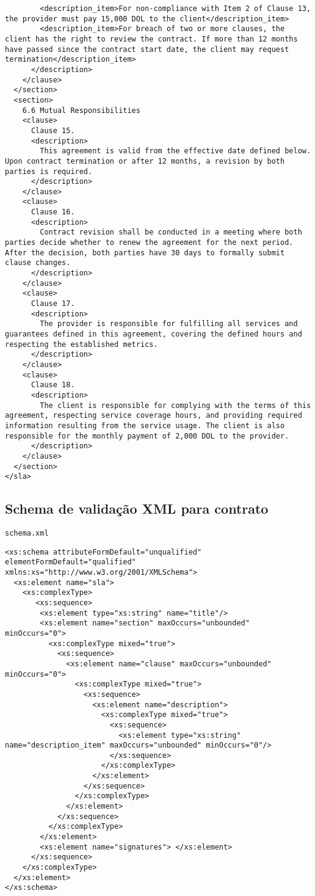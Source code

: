 \begin{lstlisting}
        <description_item>For non-compliance with Item 2 of Clause 13, the provider must pay 15,000 DOL to the client</description_item>
        <description_item>For breach of two or more clauses, the client has the right to review the contract. If more than 12 months have passed since the contract start date, the client may request termination</description_item>
      </description>
    </clause>
  </section>
  <section>
    6.6 Mutual Responsibilities
    <clause>
      Clause 15.
      <description>
        This agreement is valid from the effective date defined below. Upon contract termination or after 12 months, a revision by both parties is required.
      </description>
    </clause>
    <clause>
      Clause 16.
      <description>
        Contract revision shall be conducted in a meeting where both parties decide whether to renew the agreement for the next period. After the decision, both parties have 30 days to formally submit clause changes.
      </description>
    </clause>
    <clause>
      Clause 17.
      <description>
        The provider is responsible for fulfilling all services and guarantees defined in this agreement, covering the defined hours and respecting the established metrics.
      </description>
    </clause>
    <clause>
      Clause 18.
      <description>
        The client is responsible for complying with the terms of this agreement, respecting service coverage hours, and providing required information resulting from the service usage. The client is also responsible for the monthly payment of 2,000 DOL to the provider.
      </description>
    </clause>
  </section>
</sla>
\end{lstlisting}

\subsection{Schema de validação XML para contrato}\label{sec:schema}

\texttt{schema.xml}
\begin{lstlisting}
<xs:schema attributeFormDefault="unqualified" elementFormDefault="qualified" xmlns:xs="http://www.w3.org/2001/XMLSchema">
  <xs:element name="sla">
    <xs:complexType>
       <xs:sequence>
        <xs:element type="xs:string" name="title"/>
        <xs:element name="section" maxOccurs="unbounded" minOccurs="0"> 
          <xs:complexType mixed="true">
            <xs:sequence>
              <xs:element name="clause" maxOccurs="unbounded" minOccurs="0">
                <xs:complexType mixed="true">
                  <xs:sequence>
                    <xs:element name="description">
                      <xs:complexType mixed="true">
                        <xs:sequence>
                          <xs:element type="xs:string" name="description_item" maxOccurs="unbounded" minOccurs="0"/>
                        </xs:sequence>
                      </xs:complexType>
                    </xs:element>
                  </xs:sequence>
                </xs:complexType>
              </xs:element>
            </xs:sequence>
          </xs:complexType>
        </xs:element>
        <xs:element name="signatures"> </xs:element>
      </xs:sequence>
    </xs:complexType>
  </xs:element>
</xs:schema>
\end{lstlisting}
